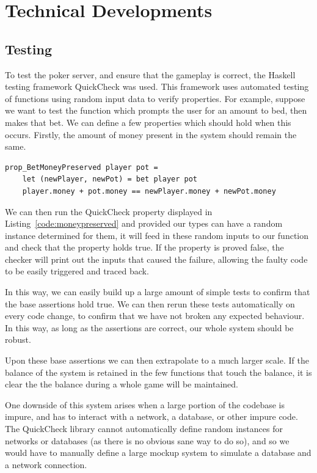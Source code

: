 \section{Technical Developments}

\subsection{Testing}
To test the poker server, and ensure that the gameplay is correct, the
Haskell testing framework QuickCheck\cite{claessen2000} was used. This
framework uses automated testing of functions using random input data to
verify properties. For example, suppose we want to test the function which
prompts the user for an amount to bed, then makes that bet. We can define a
few properties which should hold when this occurs.
Firstly, the amount of money present in the system should remain the same.

\begin{lstlisting}[label={code:moneypreserved}, caption=An example QuickCheck property]
prop_BetMoneyPreserved player pot =
    let (newPlayer, newPot) = bet player pot
    player.money + pot.money == newPlayer.money + newPot.money
\end{lstlisting}

We can then run the QuickCheck property displayed in Listing~\ref{code:moneypreserved}
and provided our types can have a random instance determined for them, it
will feed in these random inputs to our function and check that the property
holds true. If the property is proved false, the checker will print out the
inputs that caused the failure, allowing the faulty code to be easily triggered
and traced back.

In this way, we can easily build up a large amount of simple tests to confirm
that the base assertions hold true. We can then rerun these tests automatically
on every code change, to confirm that we have not broken any expected
behaviour. In this way, as long as the assertions are correct, our whole
system should be robust.

Upon these base assertions we can then extrapolate to a much larger scale.
If the balance of the system is retained in the few functions that touch
the balance, it is clear the the balance during a whole game will be maintained.

One downside of this system arises when a large portion of the codebase is
impure, and has to interact with a network, a database, or other impure code.
The QuickCheck library cannot automatically define random instances for
networks or databases (as there is no obvious sane way to do so), and so we
would have to manually define a large mockup system to simulate a database
and a network connection.

